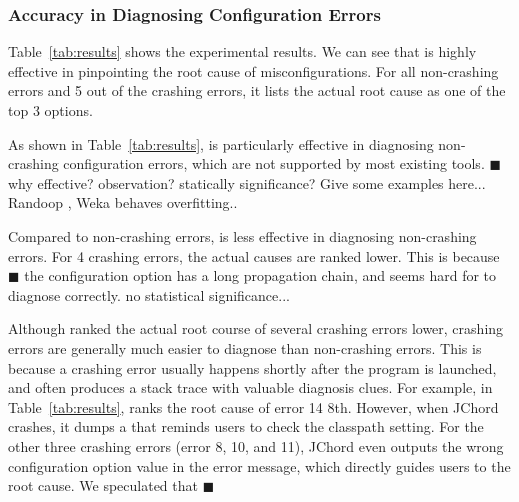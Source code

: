 \begin{table*}[t]
\end{table*}


\subsubsection{Accuracy in Diagnosing Configuration Errors}

Table~\ref{tab:results} shows the experimental results.
We can see that \ourtool is highly effective in pinpointing the root cause of
misconfigurations. For all \noncrash non-crashing errors
and 5 out of the \crash crashing errors, it lists the actual root cause as one of the
top 3 options. 


As shown in Table~\ref{tab:results}, \ourtool is particularly effective
in diagnosing non-crashing configuration errors, which are not supported
by most existing tools. $\blacksquare$ why effective? observation?
statically significance? Give some examples here... Randoop ,
Weka behaves overfitting..


Compared to non-crashing errors, \ourtool is less effective
in diagnosing non-crashing errors. For 4 crashing errors,
the actual causes are ranked lower.
This is because $\blacksquare$ the configuration option has
a long propagation chain, and seems hard for \ourtool
to diagnose correctly. no statistical significance...

Although \ourtool ranked the actual root course of several
crashing errors lower, crashing errors are generally much easier to diagnose than non-crashing errors.
This is because a crashing error usually happens shortly after the program
is launched, and often produces a stack trace with valuable diagnosis clues.
For example, in Table~\ref{tab:results}, \ourtool ranks the root cause of
error 14  8th.
However, when JChord crashes, it dumps a 
that reminds users to check the classpath setting. For the other three crashing errors (error 8, 10, and 11),
JChord even outputs the wrong configuration option value in the
error message, which
directly guides users to the root cause. We speculated that $\blacksquare$

